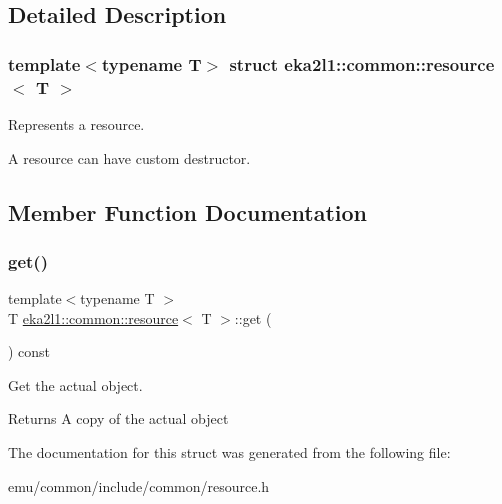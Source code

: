 \subsection{Detailed Description}
\subsubsection*{template$<$typename T$>$\newline
struct eka2l1\+::common\+::resource$<$ T $>$}

Represents a resource. 

A resource can have custom destructor. 

\subsection{Member Function Documentation}
\mbox{\label{structeka2l1_1_1common_1_1resource_a7ab875292c58fc8de45498e7bad0ea68}} 
\subsubsection{\texorpdfstring{get()}{get()}}
{\footnotesize\ttfamily template$<$typename T $>$ \\
T \mbox{\hyperlink{structeka2l1_1_1common_1_1resource}{eka2l1\+::common\+::resource}}$<$ T $>$\+::get (\begin{DoxyParamCaption}{ }\end{DoxyParamCaption}) const\hspace{0.3cm}{\ttfamily [inline]}}



Get the actual object. 

\begin{DoxyReturn}{Returns}
A copy of the actual object 
\end{DoxyReturn}


The documentation for this struct was generated from the following file\+:\begin{DoxyCompactItemize}
\item 
emu/common/include/common/resource.\+h\end{DoxyCompactItemize}
